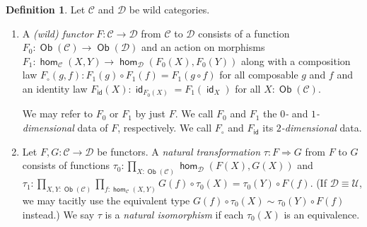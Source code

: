 \documentclass[10pt,a4paper]{article}
\theoremstyle{definition}
\newtheorem{defi}[thm]{Definition}
\theoremstyle{remark}
\newcommand{\C}{\mathcal C}
\newcommand{\D}{\mathcal D}
\newcommand{\U}{\mathcal{U}}
\newcommand{\0}{\mathbf{0}}
\newcommand{\1}{\mathbf{1}}
\newcommand{\2}{\mathbf{2}}
\DeclareMathOperator{\homm}{\mathsf{hom}}
\DeclareMathOperator{\idd}{\mathsf{id}}
\DeclareMathOperator{\obb}{\mathsf{Ob}}
\begin{document}
\begin{defi}
Let $\C$ and $\D$ be wild categories.

\begin{enumerate}
\item A \emph{(wild) functor} $F : \C \to \D$ from $\C$ to $\D$ consists of a function $F_0 : \obb(\C) \to \obb(\D)$ and an action on morphisms $F_1  : \homm_{\C}(X,Y) \to \homm_{\D}(F_0(X), F_0(Y))$  along with a composition law $F_{\circ}(g,f)  : F_1(g) \circ F_1(f) = F_1(g \circ f) $ for all composable $g$ and $f$ and an identity law $F_{\idd}(X)   : \idd_{F_0(X)} = F_1(\idd_X)$ for all $X : \obb(\C)$.

We may refer to $F_0$ or $F_1$ by just $F$. We call $F_0$ and $F_1$ the \emph{$0$-} and \emph{$1$-dimensional} data of $F$, respectively. We call $F_{\circ}$ and $F_{\idd}$ its \emph{$2$-dimensional} data.

\item Let $F, G : \C \to \D$ be functors. A \emph{natural transformation} $\tau : F \Rightarrow G$ from $F$ to $G$ consists of functions 
$\tau_0 :\prod_{X : \obb(\C)}\homm_{\D}(F(X), G(X))$ and $\tau_1  : \prod_{X, Y : \obb(\C)}\prod_{f : \homm_{\C}(X , Y)}G(f) \circ \tau_0(X) = \tau_0(Y) \circ F(f)$. (If $\D \equiv \U$, we may tacitly use the equivalent type $G(f) \circ \tau_0(X) \sim \tau_0(Y) \circ F(f)$ instead.)
We say $\tau$ is a \emph{natural isomorphism} if each $\tau_0(X)$ is an equivalence.  
\end{enumerate}
\end{defi}
\end{document}
